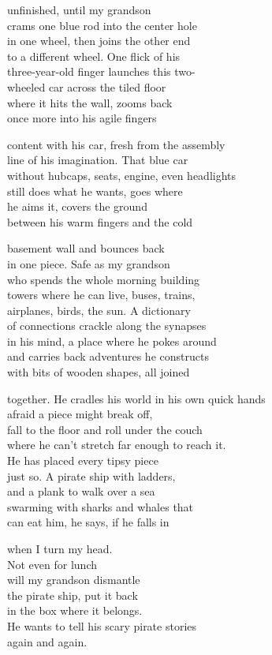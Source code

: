 \documentclass[twoside,10pt]{book}
\begin{document}
unfinished, until my grandson\\
crams one blue rod into the center hole\\
in one wheel, then joins the other end\\
to a different wheel. One flick of his\\
three-year-old finger launches this two-\\
wheeled car across the tiled floor\\
where it hits the wall, zooms back\\
once more into his agile fingers

content with his car, fresh from the assembly\\
line of his imagination. That blue car\\
without hubcaps, seats, engine, even headlights\\
still does what he wants, goes where\\
he aims it, covers the ground\\
between his warm fingers and the cold

basement wall and bounces back\\
in one piece. Safe as my grandson\\
who spends the whole morning building\\
towers where he can live, buses, trains,\\
airplanes, birds, the sun. A dictionary\\
of connections crackle along the synapses\\
in his mind, a place where he pokes around\\
and carries back adventures he constructs\\
with bits of wooden shapes, all joined

together. He cradles his world in his own quick hands\\
afraid a piece might break off,\\
fall to the floor and roll under the couch\\
where he can't stretch far enough to reach it.\\
He has placed every tipsy piece\\
just so. A pirate ship with ladders,\\
and a plank to walk over a sea\\
swarming with sharks and whales that\\
can eat him, he says, if he falls in

when I turn my head.\\
Not even for lunch\\
will my grandson dismantle\\
the pirate ship, put it back\\
in the box where it belongs.\\
He wants to tell his scary pirate stories\\
again and again.
\end{document}
